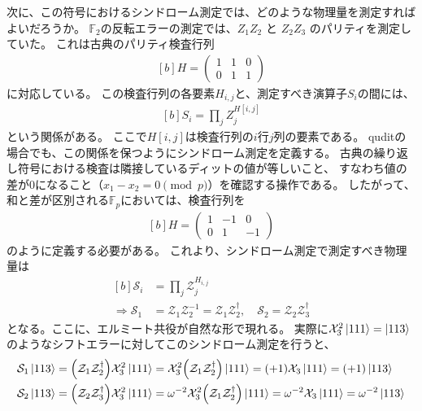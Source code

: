 \documentclass[../master.tex]{subfiles}
\begin{document}
次に、この符号におけるシンドローム測定では、どのような物理量を測定すればよいだろうか。
$\mathbb{F}_2$の反転エラーの測定では、$Z_1Z_2$ と $Z_2Z_3$ のパリティを測定していた。
これは古典のパリティ検査行列
\begin{equation}\begin{aligned}[b]
    H = \begin{pmatrix}
        1 & 1 & 0 \\
        0 & 1 & 1
    \end{pmatrix}
\end{aligned}\end{equation}
に対応している。
この検査行列の各要素$H_{i,j}$と、測定すべき演算子$S_i$の間には、
\begin{equation}\begin{aligned}[b]
    S_i = \prod_j Z_j^{H[i,j]}
\end{aligned}\end{equation}
という関係がある。
ここで$H[i,j]$は検査行列の$i$行$j$列の要素である。
quditの場合でも、この関係を保つようにシンドローム測定を定義する。
古典の繰り返し符号における検査は隣接しているディットの値が等しいこと、
すなわち値の差が0になること（$x_1 - x_2 = 0 \pmod p$）を確認する操作である。
したがって、和と差が区別される$\mathbb{F}_p$においては、検査行列を
\begin{equation}\begin{aligned}[b]
    H = \begin{pmatrix}
        1 & -1 & 0 \\
        0 & 1 & -1
    \end{pmatrix}
\end{aligned}\end{equation}
のように定義する必要がある。
これより、シンドローム測定で測定すべき物理量は
\begin{equation}\begin{aligned}[b]
    \mathcal{S}_i &= \prod_j \mathcal{Z}_{j}^{H_{i,j}}\\
    \Rightarrow \mathcal{S}_1 &= \mathcal{Z}_{1} \mathcal{Z}_{2}^{-1}
    = \mathcal{Z}_{1} \mathcal{Z}_{2}^\dagger, \quad
     \mathcal{S}_2 = \mathcal{Z}_{2} \mathcal{Z}_{3}^\dagger
\end{aligned}\end{equation}
となる。ここに、エルミート共役が自然な形で現れる。
実際に$\mathcal{X}_3^2\ket{111}=\ket{113}$のようなシフトエラーに対してこのシンドローム測定を行うと、
\begin{equation}\begin{aligned}[b]
    \mathcal{S}_1 \ket{113} &= \qty(\mathcal{Z}_1\mathcal{Z}_2^\dagger)\mathcal{X}_3^2 \ket{111}
    = \mathcal{X}_3^2 \qty(\mathcal{Z}_1\mathcal{Z}_2^\dagger)\ket{111}
    = (+1)\mathcal{X}_3\ket{111} = (+1) \ket{113}\\
    \mathcal{S}_2 \ket{113} &= \qty(\mathcal{Z}_2\mathcal{Z}_3^\dagger)\mathcal{X}_3^2 \ket{111}
    = \omega^{-2}\mathcal{X}_3^2 \qty(\mathcal{Z}_1\mathcal{Z}_2^\dagger)\ket{111}
    = \omega^{-2} \mathcal{X}_3\ket{111}
    = \omega^{-2}\ket{113}
\end{aligned}\end{equation}
\end{document}
